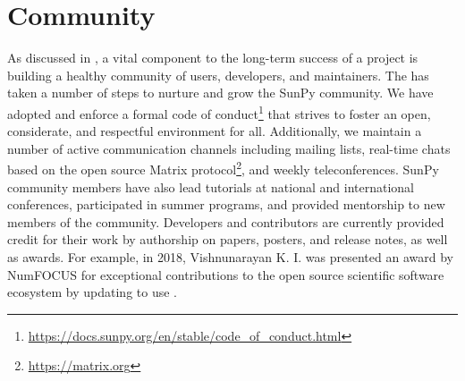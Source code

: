 \section{Community}
\label{sec:community}

As discussed in \citet{bangerth2013}, a vital component to the long-term success of a project is building a healthy community of users, developers, and maintainers.
The \sunpyproj has taken a number of steps to nurture and grow the SunPy community.
We have adopted and enforce a formal code of conduct\footnote{\url{https://docs.sunpy.org/en/stable/code_of_conduct.html}} that strives to foster an open, considerate, and respectful environment for all.
Additionally, we maintain a number of active communication channels including mailing lists, real-time chats based on the open source Matrix protocol\footnote{\url{https://matrix.org}}, and weekly teleconferences.
SunPy community members have also lead tutorials at national and international conferences, participated in summer programs, and provided mentorship to new members of the community.
Developers and contributors are currently provided credit for their work by authorship on papers, posters, and release notes, as well as awards.
For example, in 2018, Vishnunarayan K. I. was presented an award by NumFOCUS for exceptional contributions to the open source scientific software ecosystem by updating \sunpypkg to use .
